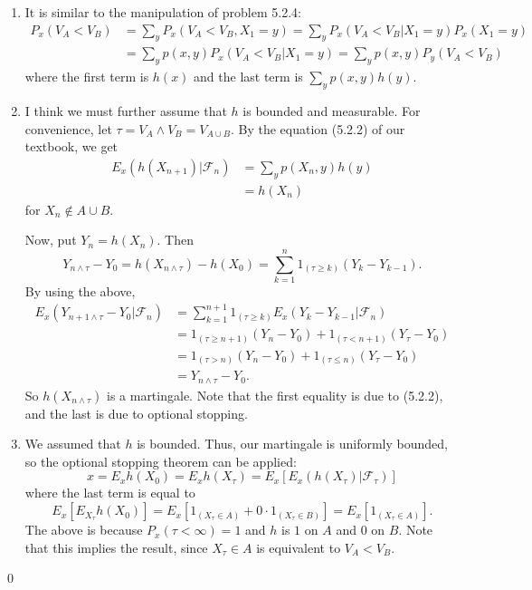 \begin{problem}[5.2.7]\hfill
	
	\begin{enumerate}
		\item It is similar to the manipulation of problem 5.2.4: 
			\[
				\begin{split}
					P_x\left( V_A < V_B \right) & = \sum_{y}P_x\left( V_A < V_B, X_1 = y \right)
					= \sum_{y}P_x\left( V_A < V_B \lvert X_1 = y \right)P_x\left( X_1 = y \right) \\
					& = \sum_{y}p(x, y) P_x\left( V_A < V_B \lvert X_1 = y \right) = \sum_{y}p(x, y)P_y\left( V_A < V_B \right)
				\end{split}
			\]
			where the first term is $h(x)$ and the last term is $\sum_{y}p(x, y)h(y)$.

		\item I think we must further assume that $h$ is bounded and measurable.
			For convenience, let $\tau = V_A \wedge V_B = V_{A \cup B}$.
			By the equation (5.2.2) of our textbook, we get
			\[
				\begin{split}
					E_x\left( h(X_{n+1}) \lvert \mathcal{F}_n \right)
					&= \sum_y p(X_n, y)h(y) \\
					&= h(X_n)
				\end{split}
			\]
			for $X_n \notin A\cup B$.

			Now, put $Y_n = h(X_n)$.
			Then
			\[
				Y_{n\wedge \tau} -Y_0 = h\left( X_{n\wedge \tau} \right) - h(X_0) = \sum_{k=1}^n 1_{\left( \tau \geq k\right)}\left( Y_k -Y_{k-1} \right).
			\]
			By using the above,
			\[
				\begin{split}
					E_x \left( Y_{n+1 \wedge \tau} - Y_0 \lvert \mathcal{F}_n \right)
					& = \sum_{k=1}^{n+1} 1_{(\tau \geq k)}E_x\left( Y_k - Y_{k-1} \lvert \mathcal{F}_n \right) \\
					&= 1_{(\tau \geq n+1)}\left( Y_n - Y_0 \right) + 1_{(\tau < n+1)}\left( Y_\tau - Y_0 \right) \\
					&= 1_{(\tau > n)}(Y_n -Y_0) + 1_{(\tau \leq n)} (Y_\tau -Y_0) \\
					&= Y_{n\wedge \tau} - Y_0.
				\end{split}
			\]
			So $h(X_{n\wedge \tau})$ is a martingale.
			Note that the first equality is due to (5.2.2), and the last is due to optional stopping.
			
		\item We assumed that $h$ is bounded.
			Thus, our martingale is uniformly bounded, so the optional stopping theorem can be applied:
			\[
				x = E_x h(X_0) = E_x h(X_\tau) 
				= E_x \left[ E_x \left(h( X_\tau) \lvert \mathcal{F}_{\tau} \right) \right]
			\]
			where the last term is equal to
			\[
				E_x \left[ E_{X_\tau}h(X_0) \right] 
				= E_x\left[ 1_{(X_\tau \in A)} +0\cdot 1_{(X_\tau \in B)} \right]
				= E_x \left[ 1_{(X_\tau \in A)} \right].
			\]
			The above is because $P_x(\tau < \infty) = 1$ and $h$ is $1$ on $A$ and $0$ on $B$.	
			Note that this implies the result, since $X_\tau \in A$ is equivalent to $V_A < V_B$.
	\end{enumerate}

	\qed
\end{problem}

